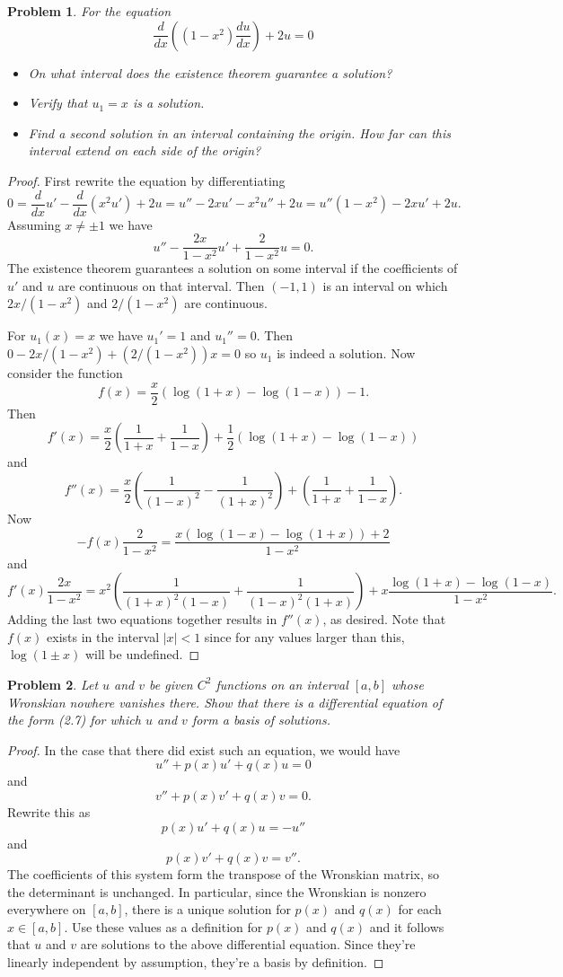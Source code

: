 \documentclass{article}
\newtheorem{problem}{Problem}
\begin{document}
\begin{problem}
For the equation
\[
\frac{d}{dx} \left ( \left ( 1 - x^2 \right ) \frac{du}{dx} \right ) + 2u = 0
\]
\begin{itemize}
\item On what interval does the existence theorem guarantee a solution?
\item Verify that $u_1 = x$ is a solution.
\item Find a second solution in an interval containing the origin. How far can this interval extend on each side of the origin?
\end{itemize}
\end{problem}
\begin{proof}
First rewrite the equation by differentiating
\[
0 = \frac{d}{d x} u' - \frac{d}{dx} (x^2 u') + 2u = u'' - 2xu' - x^2u'' + 2u = u'' (1 - x^2) - 2xu' + 2u.
\]
Assuming $x \neq \pm 1$ we have
\[
u'' - \frac{2x}{1 - x^2} u' + \frac{2}{1 - x^2} u = 0.
\]
The existence theorem guarantees a solution on some interval if the coefficients of $u'$ and $u$ are continuous on that interval. Then $(-1, 1)$ is an interval on which $2x/(1 - x^2)$ and $2/(1 - x^2)$ are continuous.

For $u_1(x) = x$ we have $u_1' = 1$ and $u_1'' = 0$. Then $0 - 2x/(1 - x^2) + (2/(1-x^2))x = 0$ so $u_1$ is indeed a solution. Now consider the function
\[
f(x) = \frac{x}{2} (\log(1+x) - \log(1-x)) - 1.
\]
Then
\[
f'(x) = \frac{x}{2} \left ( \frac{1}{1+x} + \frac{1}{1-x} \right ) + \frac{1}{2} (\log(1+x) - \log(1-x))
\]
and
\[
f''(x) = \frac{x}{2} \left ( \frac{1}{(1-x)^2} - \frac{1}{(1+x)^2} \right ) + \left ( \frac{1}{1+x} + \frac{1}{1-x} \right ).
\]
Now
\[
-f(x) \frac{2}{1 - x^2} = \frac{x(\log(1-x) - \log(1+x)) + 2}{1 - x^2}
\]
and
\[
f'(x) \frac{2x}{1 - x^2} = x^2 \left ( \frac{1}{(1+x)^2(1-x)} + \frac{1}{(1-x)^2(1+x)} \right ) + x \frac{\log(1+x) - \log(1-x)}{1 - x^2}.
\]
Adding the last two equations together results in $f''(x)$, as desired. Note that $f(x)$ exists in the interval $|x| < 1$ since for any values larger than this, $\log(1 \pm x)$ will be undefined.
\end{proof}

\begin{problem}
Let $u$ and $v$ be given $C^2$ functions on an interval $[a,b]$ whose Wronskian nowhere vanishes there. Show that there is a differential equation of the form (2.7) for which $u$ and $v$ form a basis of solutions.
\end{problem}
\begin{proof}
In the case that there did exist such an equation, we would have
\[
u'' + p(x) u' + q(x) u = 0
\]
and
\[
v'' + p(x) v' + q(x) v = 0.
\]
Rewrite this as
\[
p(x) u' + q(x) u = -u''
\]
and
\[
p(x) v' + q(x) v = v''.
\]
The coefficients of this system form the transpose of the Wronskian matrix, so the determinant is unchanged. In particular, since the Wronskian is nonzero everywhere on $[a,b]$, there is a unique solution for $p(x)$ and $q(x)$ for each $x \in [a,b]$. Use these values as a definition for $p(x)$ and $q(x)$ and it follows that $u$ and $v$ are solutions to the above differential equation. Since they're linearly independent by assumption, they're a basis by definition.
\end{proof}
\end{document}
